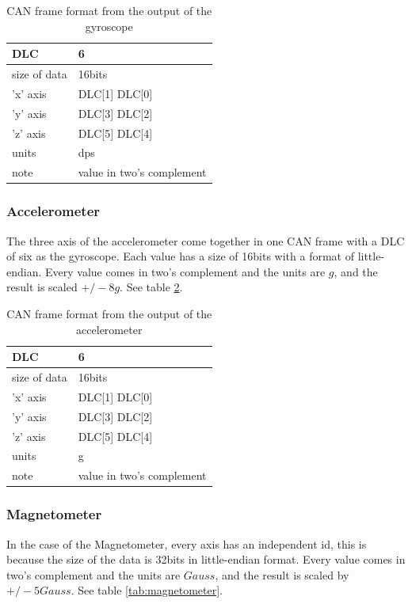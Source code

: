 \documentclass[12pt]{report}%
\begin{document}
\begin{table}[h!]
\centering
\begin{tabular}{|l|l|}
	\hline
	DLC						&	6													\\	\hline
	size of data	&	16bits										\\	\hline
	'x' axis			&	DLC[1] DLC[0]							\\	\hline
	'y'	axis			&	DLC[3] DLC[2]							\\	\hline
	'z'	axis			&	DLC[5] DLC[4]							\\	\hline
	units					&	dps												\\	\hline
	note					& value in two's complement \\	\hline
\end{tabular}
\caption{\label{tab:gyroscope} CAN frame format from the output of the gyroscope}
\end{table}

\subsubsection{Accelerometer}
The three axis of the accelerometer come together in one CAN frame with a DLC of six as the gyroscope. Each value has a size of 16bits with a format of little-endian. Every value comes in two's complement and the units are $g$, and the result is scaled $+/-8g$. See table \ref{tab:accelerometer}.

\begin{table}[h!]
\centering
\begin{tabular}{|l|l|}
	\hline
	DLC						&	6													\\	\hline
	size of data	&	16bits										\\	\hline
	'x' axis			&	DLC[1] DLC[0]							\\	\hline
	'y'	axis			&	DLC[3] DLC[2]							\\	\hline
	'z'	axis			&	DLC[5] DLC[4]							\\	\hline
	units					&	g													\\	\hline
	note					& value in two's complement \\	\hline
\end{tabular}
\caption{\label{tab:accelerometer} CAN frame format from the output of the accelerometer}
\end{table}

\subsubsection{Magnetometer}
In the case of the Magnetometer, every axis has an independent id, this is because the size of the data is 32bits in little-endian format. Every value comes in two's complement and the units are $Gauss$, and the result is scaled by $+/-5Gauss$. See table \ref{tab:magnetometer}.
\end{document}

